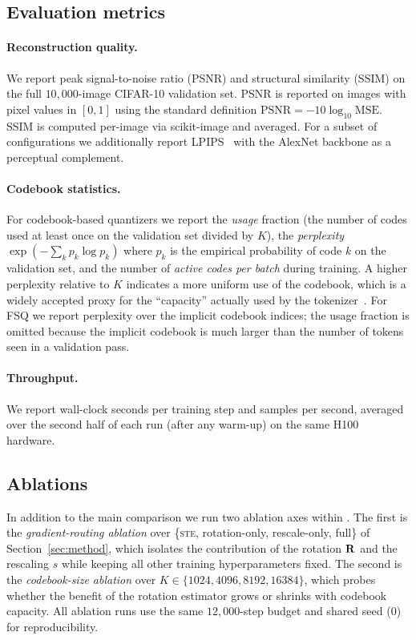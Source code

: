 \subsection{Evaluation metrics}

\paragraph{Reconstruction quality.}
We report peak signal-to-noise ratio (PSNR) and structural
similarity (SSIM) on the full $10{,}000$-image CIFAR-10 validation
set. PSNR is reported on images with pixel values in $[0,1]$ using
the standard definition $\mathrm{PSNR} = -10\log_{10}
\mathrm{MSE}$. SSIM is computed per-image via scikit-image and
averaged. For a subset of configurations we additionally report
LPIPS~\citep{zhang2018lpips} with the AlexNet backbone as a
perceptual complement.

\paragraph{Codebook statistics.}
For codebook-based quantizers we report the \emph{usage} fraction
(the number of codes used at least once on the validation set
divided by $K$), the \emph{perplexity}
$\exp(-\sum_k p_k \log p_k)$ where $p_k$ is the empirical probability
of code $k$ on the validation set, and the number of \emph{active
codes per batch} during training. A higher perplexity relative to
$K$ indicates a more uniform use of the codebook, which is a widely
accepted proxy for the ``capacity'' actually used by the
tokenizer~\citep{huh2023straighteningste,
zheng2023onlineclustered}. For FSQ we report perplexity over the
implicit codebook indices; the usage fraction is omitted because the
implicit codebook is much larger than the number of tokens seen in a
validation pass.

\paragraph{Throughput.}
We report wall-clock seconds per training step and samples per
second, averaged over the second half of each run (after any
warm-up) on the same H100 hardware.

\subsection{Ablations}

In addition to the main comparison we run two ablation axes within
\ours{}. The first is the \emph{gradient-routing ablation} over
\{\textsc{ste}, rotation-only, rescale-only, full\} of
Section~\ref{sec:method}, which isolates the contribution of the
rotation $\mathbf{R}$ and the rescaling $s$ while keeping all other
training hyperparameters fixed. The second is the \emph{codebook-size
ablation} over $K \in \{1024, 4096, 8192, 16384\}$, which probes
whether the benefit of the rotation estimator grows or shrinks with
codebook capacity. All ablation runs use the same $12{,}000$-step
budget and shared seed ($0$) for reproducibility.

